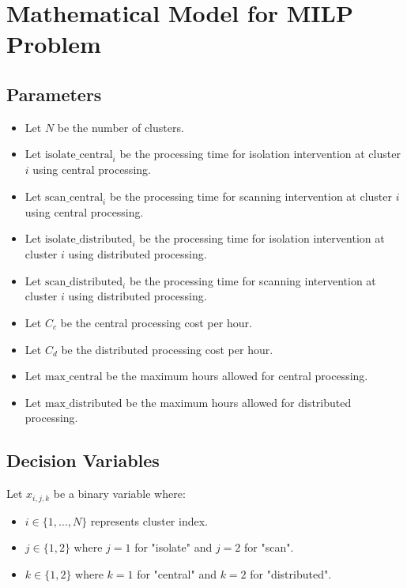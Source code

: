 \documentclass{article}
\begin{document}
\section*{Mathematical Model for MILP Problem}

\subsection*{Parameters}
\begin{itemize}
    \item Let \( N \) be the number of clusters.
    \item Let \( \text{isolate\_central}_{i} \) be the processing time for isolation intervention at cluster \( i \) using central processing.
    \item Let \( \text{scan\_central}_{i} \) be the processing time for scanning intervention at cluster \( i \) using central processing.
    \item Let \( \text{isolate\_distributed}_{i} \) be the processing time for isolation intervention at cluster \( i \) using distributed processing.
    \item Let \( \text{scan\_distributed}_{i} \) be the processing time for scanning intervention at cluster \( i \) using distributed processing.
    \item Let \( C_c \) be the central processing cost per hour.
    \item Let \( C_d \) be the distributed processing cost per hour.
    \item Let \( \text{max\_central} \) be the maximum hours allowed for central processing.
    \item Let \( \text{max\_distributed} \) be the maximum hours allowed for distributed processing.
\end{itemize}

\subsection*{Decision Variables}
Let \( x_{i,j,k} \) be a binary variable where:
\begin{itemize}
    \item \( i \in \{1, \ldots, N\} \) represents cluster index.
    \item \( j \in \{1, 2\} \) where \( j=1 \) for "isolate" and \( j=2 \) for "scan".
    \item \( k \in \{1, 2\} \) where \( k=1 \) for "central" and \( k=2 \) for "distributed".
\end{itemize}
\end{document}
